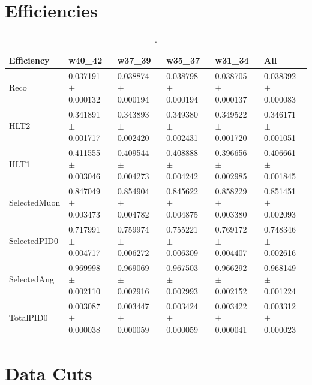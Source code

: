 \documentclass[12pt,a4paper]{article}
\begin{document}
\section{Efficiencies}
\begin{table}[h]
\centering
\begin{tabular}{llllll}
\hline
 Efficiency    & w40\_42                 & w37\_39                 & w35\_37                 & w31\_34                 & All                     \\
\hline
 Reco          & 0.037191 $\pm$ 0.000132 & 0.038874 $\pm$ 0.000194 & 0.038798 $\pm$ 0.000194 & 0.038705 $\pm$ 0.000137 & 0.038392 $\pm$ 0.000083 \\
 HLT2          & 0.341891 $\pm$ 0.001717 & 0.343893 $\pm$ 0.002420 & 0.349380 $\pm$ 0.002431 & 0.349522 $\pm$ 0.001720 & 0.346171 $\pm$ 0.001051 \\
 HLT1          & 0.411555 $\pm$ 0.003046 & 0.409544 $\pm$ 0.004273 & 0.408888 $\pm$ 0.004242 & 0.396656 $\pm$ 0.002985 & 0.406661 $\pm$ 0.001845 \\
 SelectedMuon  & 0.847049 $\pm$ 0.003473 & 0.854904 $\pm$ 0.004782 & 0.845622 $\pm$ 0.004875 & 0.858229 $\pm$ 0.003380 & 0.851451 $\pm$ 0.002093 \\
 SelectedPID0  & 0.717991 $\pm$ 0.004717 & 0.759974 $\pm$ 0.006272 & 0.755221 $\pm$ 0.006309 & 0.769172 $\pm$ 0.004407 & 0.748346 $\pm$ 0.002616 \\
 SelectedAng   & 0.969998 $\pm$ 0.002110 & 0.969069 $\pm$ 0.002916 & 0.967503 $\pm$ 0.002993 & 0.966292 $\pm$ 0.002152 & 0.968149 $\pm$ 0.001224 \\
 TotalPID0     & 0.003087 $\pm$ 0.000038 & 0.003447 $\pm$ 0.000059 & 0.003424 $\pm$ 0.000059 & 0.003422 $\pm$ 0.000041 & 0.003312 $\pm$ 0.000023 \\
\hline        
\end{tabular}
\caption{.}
\end{table}

\newpage 
\section{Data Cuts}
\end{document}
